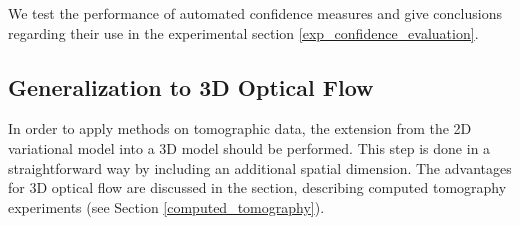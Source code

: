 We test the performance of automated confidence measures and give conclusions regarding their use in the experimental section \ref{exp_confidence_evaluation}.




%
%
%
%
%
%
%
%

\subsection{Generalization to 3D Optical Flow}
\label{extension_3d}

In order to apply \opticalflow methods on tomographic data, the extension from the 2D variational model into a 3D model should be performed.
This step is done in a straightforward way by including an additional spatial dimension. The advantages for 3D optical flow are discussed in the section, describing computed tomography experiments (see Section \ref{computed_tomography}).


